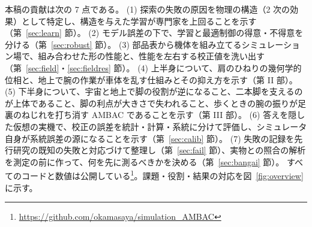 \documentclass[paper=a4paper,fontsize=10pt,twocolumn,column_gap=2zw,line_length=24zw,number_of_lines=46,head_space=20mm]{jlreq}
\newcommand{\repo}{https://github.com/okamasaya/simulation_AMBAC}
\begin{document}
本稿の貢献は次の 7 点である。
(1) 探索の失敗の原因を物理の構造（2 次の効果）として特定し、構造を与えた学習が専門家を上回ることを示す（第~\ref{sec:learn} 節）。
(2) モデル誤差の下で、学習と最適制御の得意・不得意を分ける（第~\ref{sec:robust} 節）。
(3) 部品表から機体を組み立てるシミュレーション場で、組み合わせた形の性能と、性能を左右する校正値を洗い出す（第~\ref{sec:field}・\ref{sec:fieldres} 節）。
(4) 上半身について、肩のひねりの幾何学的位相と、地上で腕の作業が車体を乱す仕組みとその抑え方を示す（第 II 部）。
(5) 下半身について、宇宙と地上で脚の役割が逆になること、二本脚を支えるのが上体であること、脚の利点が大きさで失われること、歩くときの腕の振りが足裏のねじれを打ち消す AMBAC であることを示す（第 III 部）。
(6) 答えを隠した仮想の実機で、校正の誤差を統計・計算・系統に分けて評価し、シミュレータ自身が系統誤差の源になることを示す（第~\ref{sec:calib} 節）。
(7) 失敗の記録を先行研究の既知の失敗と対応づけて整理し（第~\ref{sec:fail} 節）、実物との照合の解析を測定の前に作って、何を先に測るべきかを決める（第~\ref{sec:bangai} 節）。
すべてのコードと数値は公開している\footnote{\url{\repo}}。課題・役割・結果の対応を図~\ref{fig:overview} に示す。
\end{document}
